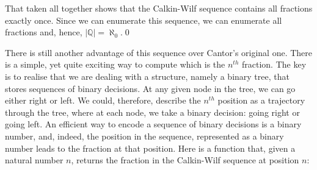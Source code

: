 \documentclass[tikz]{scrreprt}
\begin{document}
That taken all together shows that the Calkin-Wilf sequence
contains all fractions exactly once.
Since we can enumerate this sequence, we can 
enumerate all fractions and, hence, $|\mathbb{Q}| = \aleph_0$.\qed

There is still another advantage of this sequence
over Cantor's original one.
There is a simple, yet quite exciting way
to compute which is the $n^{th}$ fraction.
The key is to realise that we are dealing
with a structure, namely a binary tree, 
that stores sequences of binary decisions.
At any given node in the tree,
we can go either right or left.
We could, therefore, describe 
the $n^{th}$ position as a trajectory
through the tree, where at each node,
we take a binary decision:
going right or going left.
An efficient way to encode a sequence
of binary decisions is a binary number,
and, indeed, the position in the sequence,
represented as a binary number
leads to the fraction at that position.
Here is a function that,
given a natural number $n$,
returns the fraction in the Calkin-Wilf sequence
at position $n$:
\end{document}
